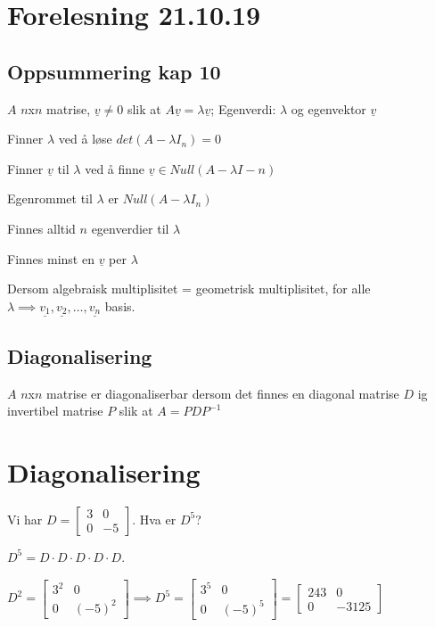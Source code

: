 \documentclass[11pt, a4paper, norsk]{article}
\begin{document}
        \section{Forelesning 21.10.19}
        \subsection{Oppsummering kap 10}%
        \label{sub:oppsummering_kap_10}
        
        $A$ $n$x$n$ matrise, $\underline{v} \neq 0$ slik at $A\underline{v} = \lambda\underline{v}$; Egenverdi: $\lambda$ og egenvektor $\underline{v}$

        Finner $\lambda$ ved å løse $det(A - \lambda I_{n}) = 0$

        Finner $\underline{v}$ til $\lambda$ ved å finne $\underline{v} \in Null(A - \lambda I-n)$ 

        Egenrommet til $\lambda$ er $Null(A - \lambda I_{n})$

        Finnes alltid $n$ egenverdier til $\lambda$

        Finnes minst en $\underline{v}$ per $\lambda$

        Dersom algebraisk multiplisitet = geometrisk multiplisitet, for alle $\lambda \implies \underline{v_1}, \underline{v_2}, \dots ,\underline{v_{n}}$ basis. 

        \subsection{Diagonalisering}%
        \label{sub:diagonalisering}
        
        \begin{Definition}{}{}
            $A$ $n$x$n$ matrise er diagonaliserbar dersom det finnes en diagonal matrise $D$ ig invertibel matrise $P$ slik at $A = PDP^{-1}$ 
        \end{Definition}

        \section{Diagonalisering}
        Vi har $D = \begin{bmatrix}
            3 & 0 \\
            0 & -5
        \end{bmatrix}$. Hva er $D^5$?

        $D^5 = D \cdot D \cdot D \cdot D \cdot D$. 

        $D^2 = \begin{bmatrix}
            3^2 & 0 \\
            0 & (-5)^2
        \end{bmatrix} \implies D^5 = \begin{bmatrix}
            3^5 & 0 \\
            0 & (-5)^5
        \end{bmatrix} = \begin{bmatrix}
            243 & 0 \\
            0 & -3125
        \end{bmatrix}$
        
\end{document}

